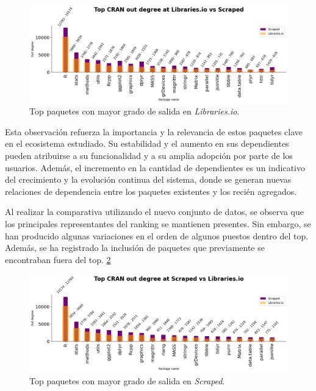 \begin{figure}[ht!]
    \begin{center}
        \includegraphics[width=1\textwidth]{img/cran/out_lib.png}
        \caption{Top paquetes con mayor grado de salida en \textit{Libraries.io}.}
        \label{fig:cran_out_libio_top}
    \end{center}
\end{figure}

Esta observación refuerza la importancia y la relevancia de estos paquetes clave en el
ecosistema estudiado. Su estabilidad y el aumento en sus dependientes pueden atribuirse a
su funcionalidad y a su amplia adopción por parte de los usuarios. Además, el incremento en
la cantidad de dependientes es un indicativo del crecimiento y la evolución continua del
sistema, donde se generan nuevas relaciones de dependencia entre los paquetes existentes
y los recién agregados.

Al realizar la comparativa utilizando el nuevo conjunto de datos, se observa que los principales
representantes del ranking se mantienen presentes. Sin embargo, se han producido algunas variaciones
en el orden de algunos puestos dentro del top. Además, se ha registrado la inclusión de paquetes que
previamente se encontraban fuera del top. \ref{fig:cran_out_scraped_top}

\begin{figure}[ht!]
    \begin{center}
        \includegraphics[width=1\textwidth]{img/cran/out_scr.png}
        \caption{Top paquetes con mayor grado de salida en \textit{Scraped}.}
        \label{fig:cran_out_scraped_top}
    \end{center}
\end{figure}

